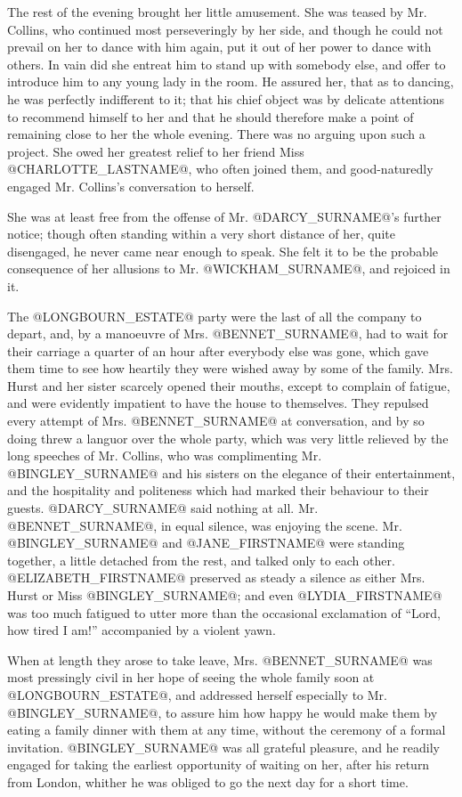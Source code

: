 The rest of the evening brought her little amusement. She was teased by
Mr. Collins, who continued most perseveringly by her side, and though
he could not prevail on her to dance with him again, put it out of her
power to dance with others. In vain did she entreat him to stand up with
somebody else, and offer to introduce him to any young lady in the room.
He assured her, that as to dancing, he was perfectly indifferent to it;
that his chief object was by delicate attentions to recommend himself to
her and that he should therefore make a point of remaining close to her
the whole evening. There was no arguing upon such a project. She owed
her greatest relief to her friend Miss @CHARLOTTE_LASTNAME@, who often joined them, and
good-naturedly engaged Mr. Collins's conversation to herself.

She was at least free from the offense of Mr. @DARCY_SURNAME@'s further notice;
though often standing within a very short distance of her, quite
disengaged, he never came near enough to speak. She felt it to be the
probable consequence of her allusions to Mr. @WICKHAM_SURNAME@, and rejoiced in
it.

The @LONGBOURN_ESTATE@ party were the last of all the company to depart, and, by
a manoeuvre of Mrs. @BENNET_SURNAME@, had to wait for their carriage a quarter of
an hour after everybody else was gone, which gave them time to see how
heartily they were wished away by some of the family. Mrs. Hurst and her
sister scarcely opened their mouths, except to complain of fatigue, and
were evidently impatient to have the house to themselves. They repulsed
every attempt of Mrs. @BENNET_SURNAME@ at conversation, and by so doing threw a
languor over the whole party, which was very little relieved by the
long speeches of Mr. Collins, who was complimenting Mr. @BINGLEY_SURNAME@ and his
sisters on the elegance of their entertainment, and the hospitality and
politeness which had marked their behaviour to their guests. @DARCY_SURNAME@ said
nothing at all. Mr. @BENNET_SURNAME@, in equal silence, was enjoying the scene.
Mr. @BINGLEY_SURNAME@ and @JANE_FIRSTNAME@ were standing together, a little detached from the
rest, and talked only to each other. @ELIZABETH_FIRSTNAME@ preserved as steady a
silence as either Mrs. Hurst or Miss @BINGLEY_SURNAME@; and even @LYDIA_FIRSTNAME@ was too
much fatigued to utter more than the occasional exclamation of ``Lord,
how tired I am!'' accompanied by a violent yawn.

When at length they arose to take leave, Mrs. @BENNET_SURNAME@ was most pressingly
civil in her hope of seeing the whole family soon at @LONGBOURN_ESTATE@, and
addressed herself especially to Mr. @BINGLEY_SURNAME@, to assure him how happy he
would make them by eating a family dinner with them at any time, without
the ceremony of a formal invitation. @BINGLEY_SURNAME@ was all grateful pleasure,
and he readily engaged for taking the earliest opportunity of waiting on
her, after his return from London, whither he was obliged to go the next
day for a short time.

